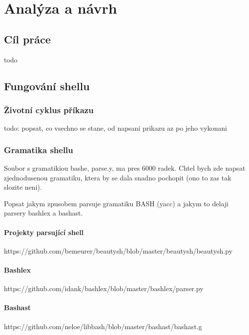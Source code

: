 \documentclass[thesis=M,czech]{FITthesis}[2012/06/26]
\begin{document}


\chapter{Analýza a návrh}

\section{Cíl práce}
todo




\section{Fungování shellu}

\subsection{Životní cyklus příkazu}

todo: popsat, co vsechno se stane, od napsani prikazu az po jeho vykonani

\subsection{Gramatika shellu}
Soubor s gramatikiou bashe, parse.y, ma pres 6000 radek. Chtel bych zde napsat zjednodusenou gramatiku, ktera by se dala snadno pochopit (ono to zas tak slozite neni).

Popsat jakym zpusobem parsuje gramatiku BASH (yacc) a jakym to delaji parsery bashlex a bashast.



\subsubsection{Projekty parsující shell}
https://github.com/bemeurer/beautysh/blob/master/beautysh/beautysh.py

\subsubsection{Bashlex}
https://github.com/idank/bashlex/blob/master/bashlex/parser.py

\subsubsection{Bashast}
https://github.com/neloe/libbash/blob/master/bashast/bashast.g
\end{document}
